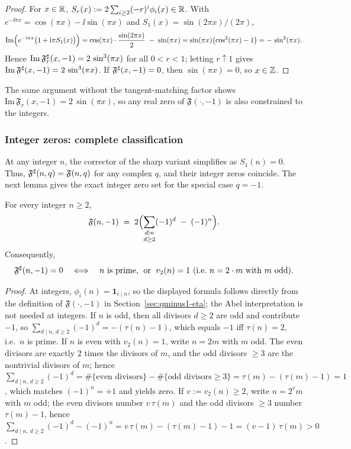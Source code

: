 \begin{proof}
For $x\in\mathbb{R}$, $S_r(x):=2\sum_{i\ge2}(-r)^i\phi_i(x)\in\mathbb{R}$.
With $e^{-\ii\pi x}=\cos(\pi x)-\ii\sin(\pi x)$ and $S_1(x)=\sin(2\pi x)/(2\pi)$,
\[
\mathrm{Im}\Bigl(e^{-\mathrm{i}\pi x}\bigl(1+\mathrm{i}\pi S_1(x)\bigr)\Bigr)
=\cos(\pi x)\cdot \frac{\sin(2\pi x)}{2}\;-\;\sin(\pi x)
=\sin(\pi x)\bigl(\cos^2(\pi x)-1\bigr)
=-\,\sin^{3}(\pi x).
\]
Hence $\mathrm{Im}\,\mathfrak F^{\sharp}_r(x,-1)=2\,\sin^{3}(\pi x)$ for all $0<r<1$; letting $r\uparrow1$ gives
$\mathrm{Im}\,\mathfrak F^{\sharp}(x,-1)=2\,\sin^{3}(\pi x)$. If $\mathfrak F^{\sharp}(x,-1)=0$, then $\sin(\pi x)=0$, so $x\in\mathbb{Z}$.
\end{proof}

\begin{remark}
The same argument without the tangent-matching factor shows
$\mathrm{Im}\,\mathfrak F_r(x,-1)=2\,\sin(\pi x)$, so any real zero of $\mathfrak F(\cdot,-1)$ is also constrained to the integers.
\end{remark}

\subsubsection*{Integer zeros: complete classification}
At any integer $n$, the corrector of the sharp variant simplifies as $S_1(n)=0$. Thus, $\mathfrak F^{\sharp}(n,q)=\mathfrak F(n,q)$ for any complex $q$, and their integer zeros coincide. The next lemma gives the exact integer zero set for the special case $q=-1$.

\begin{lemma}[Integer zeros at $q=-1$]
\label{lem:qminus1-integer-zeros}
For every integer $n\ge2$,
\[
\mathfrak F(n,-1)\;=\;2\Bigl(\sum_{\substack{d\mid n\\ d\ge2}}(-1)^d\;-\;(-1)^n\Bigr).
\]
Consequently,
\[
\mathfrak F^{\sharp}(n,-1)=0
\quad\Longleftrightarrow\quad
\text{$n$ is prime, \;or\; $v_2(n)=1$ (i.e.\ $n=2\cdot m$ with $m$ odd).}
\]
\end{lemma}

\begin{proof}
At integers, $\phi_i(n)=\mathbf 1_{i\mid n}$, so the displayed formula follows directly from the definition of
$\mathfrak F(\cdot,-1)$ in Section~\ref{sec:qminus1-eta}; the Abel interpretation is not needed at integers.
If $n$ is odd, then all divisors $d\ge2$ are odd and contribute $-1$, so
$\sum_{d\mid n,\,d\ge2}(-1)^d=-(\tau(n)-1)$, which equals $-1$ iff $\tau(n)=2$, i.e.\ $n$ is prime.
If $n$ is even with $v_2(n)=1$, write $n=2m$ with $m$ odd. The even divisors are exactly $2$ times the divisors of $m$,
and the odd divisors $\ge3$ are the nontrivial divisors of $m$; hence
$\sum_{d\mid n,\,d\ge2}(-1)^d=\#\{\text{even divisors}\}-\#\{\text{odd divisors}\ge3\}=\tau(m)-(\tau(m)-1)=1$,
which matches $(-1)^n=+1$ and yields zero. If $v:=v_2(n)\ge2$, write $n=2^{v}m$ with $m$ odd; the even divisors number $v\,\tau(m)$ and the odd divisors $\ge3$ number $\tau(m)-1$, hence
$\sum_{d\mid n,\,d\ge2}(-1)^d-(-1)^n=v\,\tau(m)-(\tau(m)-1)-1=(v-1)\,\tau(m)>0$.
\end{proof}

